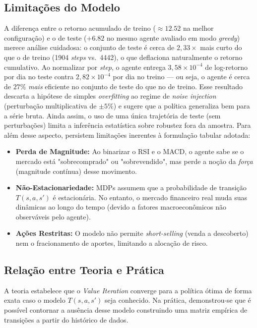 \documentclass{article}
\begin{document}
\subsection{Limitações do Modelo}\label{sec:limites}
A diferença entre o retorno acumulado de treino ($\approx 12.52$ na melhor configuração) e o de teste ($+6.82$ no mesmo agente avaliado em modo \textit{greedy}) merece análise cuidadosa: o conjunto de teste é cerca de $2{,}33\times$ mais curto do que o de treino (1904 \textit{steps} vs.\ 4442), o que deflaciona naturalmente o retorno cumulativo. Ao normalizar por \textit{step}, o agente entrega $3{,}58 \times 10^{-4}$ de log-retorno por dia no teste contra $2{,}82 \times 10^{-4}$ por dia no treino — ou seja, o agente é cerca de $27\%$ \textit{mais} eficiente no conjunto de teste do que no de treino. Esse resultado descarta a hipótese de simples \textit{overfitting} ao regime de \textit{noise injection} (perturbação multiplicativa de $\pm 5\%$) e sugere que a política generaliza bem para a série bruta. Ainda assim, o uso de uma única trajetória de teste (sem perturbações) limita a inferência estatística sobre robustez fora da amostra. Para além desse aspecto, persistem limitações inerentes à formulação tabular adotada:
\begin{itemize}
    \item \textbf{Perda de Magnitude:} Ao binarizar o RSI e o MACD, o agente sabe se o mercado está "sobrecomprado" ou "sobrevendido", mas perde a noção da \textit{força} (magnitude contínua) desse movimento.
    \item \textbf{Não-Estacionariedade:} MDPs assumem que a probabilidade de transição $T(s, a, s')$ é estacionária. No entanto, o mercado financeiro real muda suas dinâmicas ao longo do tempo (devido a fatores macroeconômicos não observáveis pelo agente).
    \item \textbf{Ações Restritas:} O modelo não permite \textit{short-selling} (venda a descoberto) nem o fracionamento de aportes, limitando a alocação de risco.
\end{itemize}

\subsection{Relação entre Teoria e Prática}
A teoria estabelece que o \textit{Value Iteration} converge para a política ótima de forma exata caso o modelo $T(s, a, s')$ seja conhecido. Na prática, demonstrou-se que é possível contornar a ausência desse modelo construindo uma matriz empírica de transições a partir do histórico de dados.
\end{document}
